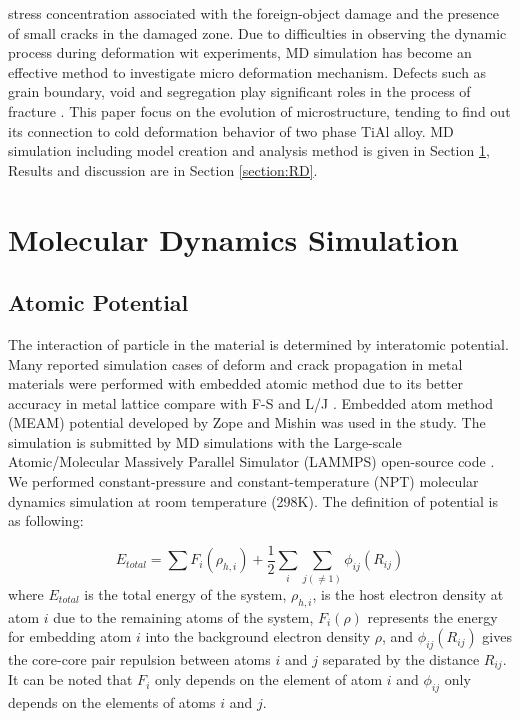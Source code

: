 \documentclass[Unknown,article,submit,moreauthors,pdftex,10pt,a4paper]{Definitions/mdpi}
\begin{document}
stress concentration associated with the foreign-object damage and the presence of small cracks in the damaged zone. Due to difficulties in observing the dynamic process during deformation wit experiments, MD simulation has become an effective method to investigate micro deformation mechanism. Defects such as grain boundary, void and segregation play significant roles in the process of fracture \cite{Larsen2016}. This paper focus on the evolution of microstructure, tending to find out its connection to cold deformation behavior of two phase TiAl alloy. MD simulation including model creation and analysis method is given in Section \ref{section:method}, Results and discussion are in Section \ref{section:RD}.

\section{Molecular Dynamics Simulation }\label{section:method}
\subsection{Atomic Potential}

The interaction of particle in the material is determined by interatomic potential. Many reported simulation cases of deform and crack propagation in metal materials were performed with embedded atomic method due to its better accuracy in metal lattice compare with F-S and L/J \cite{Ko2015,Zepeda-Ruiz2017,Fan2018a}. Embedded atom method (MEAM) potential developed by Zope and Mishin \cite{Zope2003} was used in the study. The simulation is submitted by MD simulations with the Large-scale Atomic/Molecular Massively Parallel Simulator (LAMMPS) open-source code \cite{Plimpton1995}. We performed constant-pressure and constant-temperature (NPT) molecular dynamics simulation at room temperature (298K). The definition of potential is as following:
	
\begin{equation} \label{eq:eam} 
E_{total}= \displaystyle\sum F_i(\rho_{h,i})+\frac{1}{2}\sum_i\sum_{j(\neq1)}\phi_{ij}(R_{ij})
\end{equation}
where $E_{total}$ is the total energy of the system, $\rho_{h,i}$, is the host electron density at atom $i$ due to the remaining atoms of the system, $F_i(\rho)$ represents the energy for embedding atom $i$ into the background electron density $\rho$, and $\phi_{ij}(R_{ij})$ gives the core-core pair repulsion between atoms $i$ and $j$ separated by the distance $R_{ij}$. It can be noted that $F_i$ only depends on the element of atom $i$ and $\phi_{ij}$ only depends on the elements of atoms $i$ and $j$. 
\end{document}
